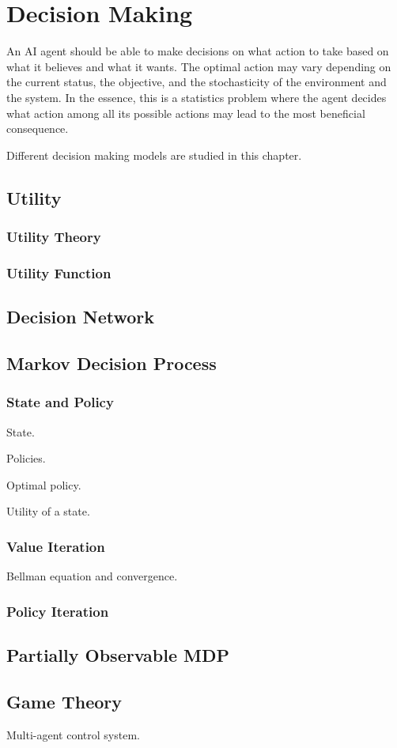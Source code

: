 \chapter{Decision Making}

An AI agent should be able to make decisions on what action to take based on what it believes and what it wants. The optimal action may vary depending on the current status, the objective, and the stochasticity of the environment and the system. In the essence, this is a statistics problem where the agent decides what action among all its possible actions may lead to the most beneficial consequence. 

Different decision making models are studied in this chapter.

\section{Utility}

\subsection{Utility Theory}

\subsection{Utility Function}

\section{Decision Network}

\section{Markov Decision Process}

\subsection{State and Policy}

State.

Policies.

Optimal policy.

Utility of a state.

\subsection{Value Iteration}

Bellman equation and convergence.

\subsection{Policy Iteration}

\section{Partially Observable MDP}

\section{Game Theory}

Multi-agent control system.